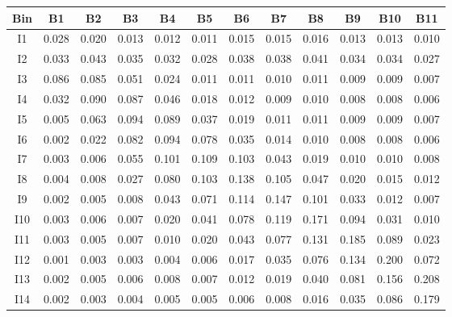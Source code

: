 \begin{tabular}{c@{~~~}c@{~~}c@{~~}c@{~~}c@{~~}c@{~~}c@{~~}c@{~~}c@{~~}c@{~~}c@{~~}c}
\hline
 \hline
Bin	& B1 & B2 & B3 & B4 & B5 & B6 & B7 & B8 & B9 & B10 & B11 \\
\hline
I1	&  0.028 &  0.020 &  0.013 &  0.012 &  0.011 &  0.015 &  0.015 &  0.016 &  0.013 &  0.013 &  0.010 \\
I2	&  0.033 &  0.043 &  0.035 &  0.032 &  0.028 &  0.038 &  0.038 &  0.041 &  0.034 &  0.034 &  0.027 \\
I3	&  0.086 &  0.085 &  0.051 &  0.024 &  0.011 &  0.011 &  0.010 &  0.011 &  0.009 &  0.009 &  0.007 \\
I4	&  0.032 &  0.090 &  0.087 &  0.046 &  0.018 &  0.012 &  0.009 &  0.010 &  0.008 &  0.008 &  0.006 \\
I5	&  0.005 &  0.063 &  0.094 &  0.089 &  0.037 &  0.019 &  0.011 &  0.011 &  0.009 &  0.009 &  0.007 \\
I6	&  0.002 &  0.022 &  0.082 &  0.094 &  0.078 &  0.035 &  0.014 &  0.010 &  0.008 &  0.008 &  0.006 \\
I7	&  0.003 &  0.006 &  0.055 &  0.101 &  0.109 &  0.103 &  0.043 &  0.019 &  0.010 &  0.010 &  0.008 \\
I8	&  0.004 &  0.008 &  0.027 &  0.080 &  0.103 &  0.138 &  0.105 &  0.047 &  0.020 &  0.015 &  0.012 \\
I9	&  0.002 &  0.005 &  0.008 &  0.043 &  0.071 &  0.114 &  0.147 &  0.101 &  0.033 &  0.012 &  0.007 \\
I10	&  0.003 &  0.006 &  0.007 &  0.020 &  0.041 &  0.078 &  0.119 &  0.171 &  0.094 &  0.031 &  0.010 \\
I11	&  0.003 &  0.005 &  0.007 &  0.010 &  0.020 &  0.043 &  0.077 &  0.131 &  0.185 &  0.089 &  0.023 \\
I12	&  0.001 &  0.003 &  0.003 &  0.004 &  0.006 &  0.017 &  0.035 &  0.076 &  0.134 &  0.200 &  0.072 \\
I13	&  0.002 &  0.005 &  0.006 &  0.008 &  0.007 &  0.012 &  0.019 &  0.040 &  0.081 &  0.156 &  0.208 \\
I14	&  0.002 &  0.003 &  0.004 &  0.005 &  0.005 &  0.006 &  0.008 &  0.016 &  0.035 &  0.086 &  0.179 \\
\hline
 \hline
\end{tabular}
